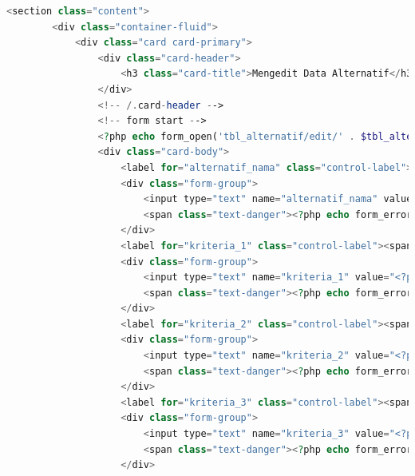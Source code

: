 \begin{lstlisting}[language=PHP]
	<section class="content">  
	    <div class="container-fluid">  
	        <div class="card card-primary">  
	            <div class="card-header">  
	                <h3 class="card-title">Mengedit Data Alternatif</h3>  
	            </div>  
	            <!-- /.card-header -->  
	            <!-- form start -->  
	            <?php echo form_open('tbl_alternatif/edit/' . $tbl_alternatif['alternatif_id']); ?>  
	            <div class="card-body">  
	                <label for="alternatif_nama" class="control-label"><span class="text-danger">*</span>Nama Alternatif</label>  
	                <div class="form-group">  
	                    <input type="text" name="alternatif_nama" value="<?php echo ($this->input->post('alternatif_nama') ? $this->input->post('alternatif_nama') : $tbl_alternatif['alternatif_nama']); ?>" class="form-control" id="alternatif_nama" />  
	                    <span class="text-danger"><?php echo form_error('alternatif_nama'); ?></span>  
	                </div>  
	                <label for="kriteria_1" class="control-label"><span class="text-danger">*</span>Harga</label>  
	                <div class="form-group">  
	                    <input type="text" name="kriteria_1" value="<?php echo ($this->input->post('kriteria_1') ? $this->input->post('kriteria_1') : $tbl_alternatif['kriteria_1']); ?>" class="form-control" id="kriteria_1" />  
	                    <span class="text-danger"><?php echo form_error('kriteria_1'); ?></span>  
	                </div>  
	                <label for="kriteria_2" class="control-label"><span class="text-danger">*</span>Kamera Depan</label>  
	                <div class="form-group">  
	                    <input type="text" name="kriteria_2" value="<?php echo ($this->input->post('kriteria_2') ? $this->input->post('kriteria_2') : $tbl_alternatif['kriteria_2']); ?>" class="form-control" id="kriteria_2" />  
	                    <span class="text-danger"><?php echo form_error('kriteria_2'); ?></span>  
	                </div>  
	                <label for="kriteria_3" class="control-label"><span class="text-danger">*</span>Kamera Belakang</label>  
	                <div class="form-group">  
	                    <input type="text" name="kriteria_3" value="<?php echo ($this->input->post('kriteria_3') ? $this->input->post('kriteria_3') : $tbl_alternatif['kriteria_3']); ?>" class="form-control" id="kriteria_3" />  
	                    <span class="text-danger"><?php echo form_error('kriteria_3'); ?></span>  
	                </div>  

\end{lstlisting}
